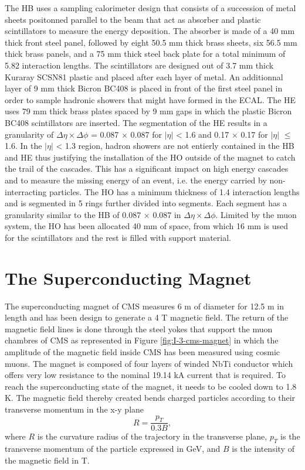     The HB uses a sampling calorimeter design that consists of a succession of metal sheets positonned parallel to the beam that act as absorber and plastic scintillators to measure the energy deposition. The absorber is made of a 40 mm thick front steel panel, followed by eight 50.5 mm thick brass sheets, six 56.5 mm thick brass panels, and a 75 mm thick steel back plate for a total minimum of 5.82 interaction lengths. The scintillators are designed out of 3.7 mm thick Kuraray SCSN81 plastic and placed after each layer of metal. An additionnal layer of 9 mm thick Bicron BC408 is placed in front of the first steel panel in order to sample hadronic showers that might have formed in the ECAL. The HE uses 79 mm thick brass plates spaced by 9 mm gaps in which the plastic Bicron BC408 scintillators are inserted. The segmentation of the HE results in a granularity of $ \Delta \eta \times \Delta \phi $ = 0.087 $ \times $ 0.087 for $ | \eta | $ < 1.6 and 0.17 $ \times $ 0.17 for $ | \eta | $ $ \le $ 1.6. In the $ | \eta | $ < 1.3 region, hadron showers are not entierly contained in the HB and HE thus justifying the installation of the HO outside of the magnet to catch the trail of the cascades. This has a significant impact on high energy cascades and to measure the missing energy of an event, i.e. the energy carried by non-interracting particles. The HO has a minimum thickness of 1.4 interaction lengths and is segmented in 5 rings further divided into segments. Each segment has a granularity similar to the HB of 0.087 $ \times $ 0.087 in $ \Delta \eta \times \Delta \phi $. Limited by the muon system, the HO has been allocated 40 mm of space, from which 16 mm is used for the scintillators and the rest is filled with support material.

  \section{The Superconducting Magnet}

    The superconducting magnet of CMS measures 6 m of diameter for 12.5 m in length and has been design to generate a 4 T magnetic field. The return of the magnetic field lines is done through the steel yokes that support the muon chambres of CMS as represented in Figure  \ref{fig:I-3-cms-magnet} in which the amplitude of the magnetic field inside CMS has been measured using cosmic muons. The magnet is composed of four layers of winded NbTi conductor which offers very low resistance to the nominal 19.14 kA current that is required. To reach the superconducting state of the magnet, it needs to be cooled down to 1.8 K. The magnetic field thereby created bends charged particles according to their transverse momentum in the x-y plane
    \begin{equation}
      R = \frac{p_T}{0.3 B} ,
    \end{equation}
    where $ R $ is the curvature radius of the trajectory in the transverse plane, $ p_T $ is the transverse momentum of the particle expressed in GeV, and $ B $ is the intensity of the magnetic field in T.

